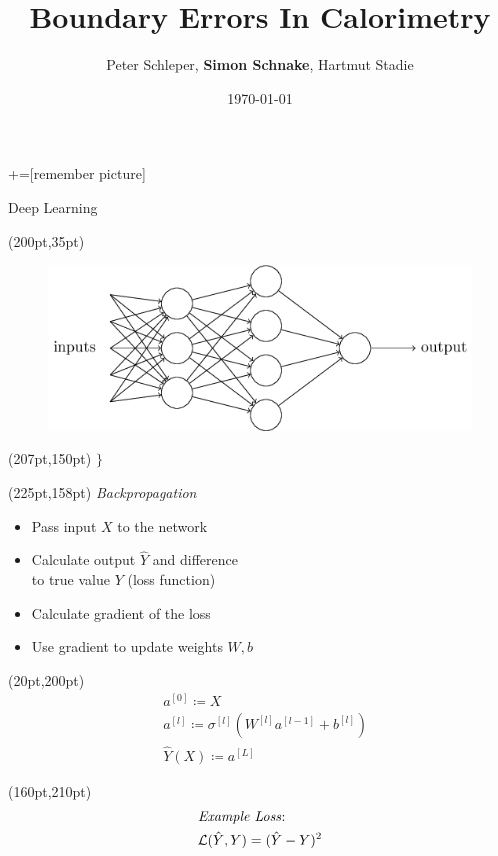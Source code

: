 \documentclass[10pt]{beamer}
\title{Boundary Errors In Calorimetry}
\date{\today}
\author{Peter Schleper, \textbf{Simon Schnake}, Hartmut Stadie}
\institute{Universität Hamburg}
\begin{document}
\maketitle
{}+=[remember picture]

\begin{frame}{Deep Learning}
  \begin{textblock*}{150pt}(200pt,35pt)
    \begin{figure}[htp]
      \includegraphics[width=\textwidth]{tikz1.png}
    \end{figure}
  \end{textblock*}
  \begin{textblock*}{150pt}(207pt,150pt)
    \Huge{$\}$}
  \end{textblock*}
  \begin{textblock*}{150pt}(225pt,158pt)
    \emph{Backpropagation}
  \end{textblock*}
  \begin{itemize}
  \item Pass input $X$ to the network
  \item Calculate output $\hat{Y}$ and difference\\ to true value $Y$ (loss function)
  \item Calculate gradient of the loss
  \item Use gradient to update weights $W, b$
  \end{itemize}
  \begin{textblock*}{150pt}(20pt,200pt)
  \begin{align*}
    &a^{[0]} \coloneqq X \\
    &a^{[l]} \coloneqq \sigma^{[l]}(W^{[l]} a^{[l-1]}+ b^{[l]})\\
    &\hat{Y}(X) \coloneqq a^{[L]}
  \end{align*}
\end{textblock*}

  \begin{textblock*}{170pt}(160pt,210pt)
  \begin{align*}
    &\text{\emph{Example Loss}:}\\
    &\mathcal{L}(\hat{Y}, Y) = (\hat{Y} - Y)^2
  \end{align*}
\end{textblock*}
\end{frame}
\end{document}
